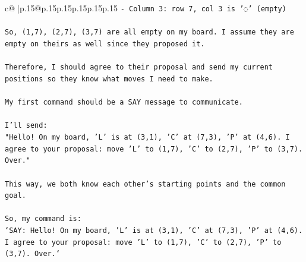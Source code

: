 \documentclass{article}
\begin{document}
{\begin{supertabular}{c@{$\;$}|p{.15\linewidth}@{}p{.15\linewidth}p{.15\linewidth}p{.15\linewidth}p{.15\linewidth}p{.15\linewidth}}
{{{\texttt{{-} Column 3: row 7, col 3 is '◌' (empty)} \\
\\ 
\texttt{So, (1,7), (2,7), (3,7) are all empty on my board. I assume they are empty on theirs as well since they proposed it.} \\
\\ 
\texttt{Therefore, I should agree to their proposal and send my current positions so they know what moves I need to make.} \\
\\ 
\texttt{My first command should be a SAY message to communicate.} \\
\\ 
\texttt{I'll send:} \\
\texttt{"Hello! On my board, 'L' is at (3,1), 'C' at (7,3), 'P' at (4,6). I agree to your proposal: move 'L' to (1,7), 'C' to (2,7), 'P' to (3,7). Over."} \\
\\ 
\texttt{This way, we both know each other's starting points and the common goal.} \\
\\ 
\texttt{So, my command is:} \\
\texttt{`SAY: Hello! On my board, 'L' is at (3,1), 'C' at (7,3), 'P' at (4,6). I agree to your proposal: move 'L' to (1,7), 'C' to (2,7), 'P' to (3,7). Over.`} \\
            }
        }
    }
     \\ \\


\end{supertabular}}
\end{document}
